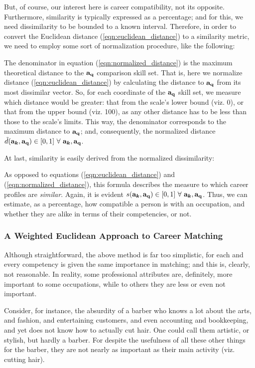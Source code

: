 \documentclass{article}
\begin{document}
But, of course, our interest here is career compatibility, not its opposite.
Furthermore, similarity is typically expressed as a percentage; and for this,
we need dissimilarity to be bounded to a known interval. Therefore, in order to
convert the Euclidean distance (\ref{eqn:euclidean_distance}) to a similarity
metric, we need to employ some sort of normalization procedure, like the
following: \EqnNormalizedDistance

The denominator in equation (\ref{eqn:normalized_distance}) is the maximum
theoretical distance to the $\vb{a_q}$ comparison skill set. That is, here we
normalize distance (\ref{eqn:euclidean_distance}) by calculating the distance
to $\vb{a_q}$ from its most dissimilar vector. So, for each coordinate of the
$\vb{a_{q}}$ skill set, we measure which distance would be greater: that from
the scale's lower bound (viz. 0), or that from the upper bound (viz. 100), as
any other distance has to be less than those to the scale's limits. This way,
the denominator corresponds to the maximum distance to $\vb{a_{q}}$; and,
consequently, the normalized distance $\tilde{d}(\vb{a_{\boldsymbol{k}}},
    \vb{a_{q}}) \in [0,1] \ \forall \ \vb{a_{\boldsymbol{k}}}, \vb{a_{q}}$.

At last, similarity is easily derived from the normalized dissimilarity:
\EqnSimilarity

As opposed to equations (\ref{eqn:euclidean_distance}) and
(\ref{eqn:normalized_distance}), this formula describes the measure to which
career profiles are \textit{similar}. Again, it is evident
$s(\vb{a_{\boldsymbol{k}}}, \vb{a_{q}}) \in [0,1] \ \forall \
    \vb{a_{\boldsymbol{k}}}, \vb{a_{q}}$. Thus, we can estimate, as a percentage,
how compatible a person is with an occupation, and whether they are alike in
terms of their competencies, or not.

\subsubsection{A Weighted Euclidean Approach to Career Matching}
Although straightforward, the above method is far too simplistic, for each and
every competency is given the same importance in matching; and this is,
clearly, not reasonable. In reality, some professional attributes are,
definitely, more important to some occupations, while to others they are less
or even not important.

Consider, for instance, the absurdity of a barber who knows a lot about the
arts, and fashion, and entertaining customers, and even accounting and
bookkeeping, and yet does not know how to actually cut hair. One could call
them artistic, or stylish, but hardly a barber. For despite the usefulness of
all these other things for the barber, they are not nearly as important as
their main activity (viz. cutting hair).
\end{document}
